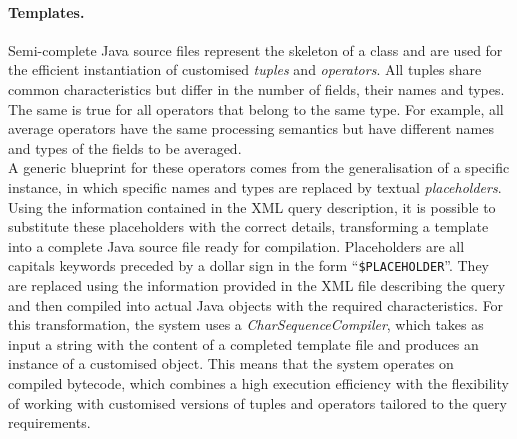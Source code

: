 \paragraph{Templates.} Semi-complete \textrm{Java} source files represent the skeleton of a class and
are used for the efficient instantiation of customised \textit{tuples} and \textit{operators}.
All tuples share common characteristics but differ in the number of fields, their names and types. The
same is true for all operators that belong to the same type. For example, all average operators have the
same processing semantics but have different names and types of the fields to be averaged. \\
A generic blueprint for these operators comes from the generalisation of a specific instance, in which
specific names and types are replaced by textual \emph{placeholders}.
Using the information contained in the XML query description, it is possible to substitute these
placeholders with the correct details, transforming a template into a complete \textrm{Java} source file
ready for compilation.
Placeholders are all capitals keywords preceded by a dollar sign in the form ``\texttt{\$PLACEHOLDER}''.
They are replaced using the information provided in the XML file describing the query and then compiled
into actual Java objects with the required characteristics.
For this transformation, the system uses a \textit{CharSequenceCompiler}, which takes as input a string
with the content of a completed \textrm{template} file and produces an instance of a customised object.
This means that the system operates on compiled bytecode, which combines a high execution efficiency with
the flexibility of working with customised versions of tuples and operators tailored to the query
requirements.
